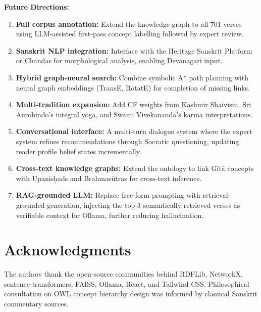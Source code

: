 \documentclass[conference]{IEEEtran}
\begin{document}
\textbf{Future Directions:}
\begin{enumerate}[leftmargin=*]
  \item \textbf{Full corpus annotation:} Extend the knowledge graph to all 701
        verses using LLM-assisted first-pass concept labelling followed by
        expert review.
  \item \textbf{Sanskrit NLP integration:} Interface with the Heritage Sanskrit
        Platform or Chandas for morphological analysis, enabling Devanagari input.
  \item \textbf{Hybrid graph-neural search:} Combine symbolic A* path planning with
        neural graph embeddings (TransE, RotatE) for completion of missing links.
  \item \textbf{Multi-tradition expansion:} Add CF weights from Kashmir Shaivism,
        Sri Aurobindo's integral yoga, and Swami Vivekananda's karma interpretations.
  \item \textbf{Conversational interface:} A multi-turn dialogue system where the
        expert system refines recommendations through Socratic questioning, updating
        reader profile belief states incrementally.
  \item \textbf{Cross-text knowledge graphs:} Extend the ontology to link G\={i}t\={a}
        concepts with Upanis\d{h}ads and Brahmas\={u}tras for cross-text inference.
  \item \textbf{RAG-grounded LLM:} Replace free-form prompting with
        retrieval-grounded generation, injecting the top-3 semantically retrieved
        verses as verifiable context for Ollama, further reducing hallucination.
\end{enumerate}

\section*{Acknowledgments}
The authors thank the open-source communities behind RDFLib, NetworkX,
sentence-transformers, FAISS, Ollama, React, and Tailwind CSS. Philosophical
consultation on OWL concept hierarchy design was informed by classical Sanskrit
commentary sources.
\end{document}
